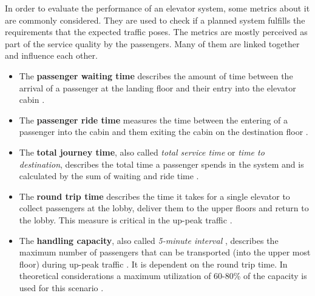 In order to evaluate the performance of an elevator system, some metrics about it are commonly considered.
They are used to check if a planned system fulfills the requirements that the expected traffic poses. 
The metrics are mostly perceived as part of the service quality by the passengers.
Many of them are linked together and influence each other.

\begin{itemize}

    \item The \textbf{passenger waiting time} 
        describes the amount of time between the arrival of a passenger at the landing floor 
        and their entry into the elevator cabin 
        \autocite[][p.~7]{hakonen2003simulation}\autocite[][pp.8-9]{siikonen1997models}.
        
    \item The \textbf{passenger ride time} 
        measures the time between the entering of a passenger into the cabin 
        and them exiting the cabin on the destination floor
    \autocite[][pp.8-9]{siikonen1997models}.
    
    \item The \textbf{total journey time}, 
        also called \emph{total service time} \autocite[][p.~10]{beers2015arrivals} or \emph{time to destination},
        describes the total time a passenger spends in the system 
        and is calculated by the sum of waiting and ride time
        \autocite[][pp.8-9]{siikonen1997models}.
        
    \item The \textbf{round trip time} 
        describes the time it takes for a single elevator to collect passengers at the lobby,
        deliver them to the upper floors and return to the lobby. 
        This measure is critical in the up-peak traffic
        \autocite[][pp.8-9]{siikonen1997models}.
        
    \item The \textbf{handling capacity}, 
        also called \emph{5-minute interval}
        \autocite[][p.~194]{unger2015aufzuege},
        describes the maximum number of passengers that can be transported (into the upper most floor) during up-peak traffic
        \autocite[][pp.8-9]{siikonen1997models}.
        It is dependent on the round trip time.
        In theoretical considerations a maximum utilization of 60-80\% of the capacity is used for this scenario
        \autocite[][p.~194]{unger2015aufzuege}\autocite[][p.~7]{hakonen2003simulation}.
    

\end{itemize}
